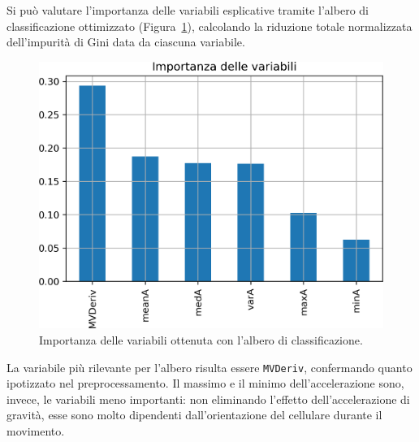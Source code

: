 \documentclass[main.tex]{subfiles}
\begin{document}
Si può valutare l'importanza delle variabili esplicative tramite l'albero di classificazione ottimizzato (Figura~\ref{fig:importance-Tree}), calcolando la riduzione totale normalizzata dell'impurità di Gini data da ciascuna variabile\cite{DecisionTreeClassifier}.
\begin{figure}[H]
	\centering
	\includegraphics[width=0.82\confusion]{../../figure/importance-Tree.png}
	\caption{Importanza delle variabili ottenuta con l'albero di classificazione.}
	\label{fig:importance-Tree}
\end{figure}
La variabile più rilevante per l'albero risulta essere \texttt{MVDeriv}, confermando quanto ipotizzato nel preprocessamento. Il massimo e il minimo dell'accelerazione sono, invece, le variabili meno importanti: non eliminando l'effetto dell'accelerazione di gravità, esse sono molto dipendenti dall'orientazione del cellulare durante il movimento.
\end{document}
